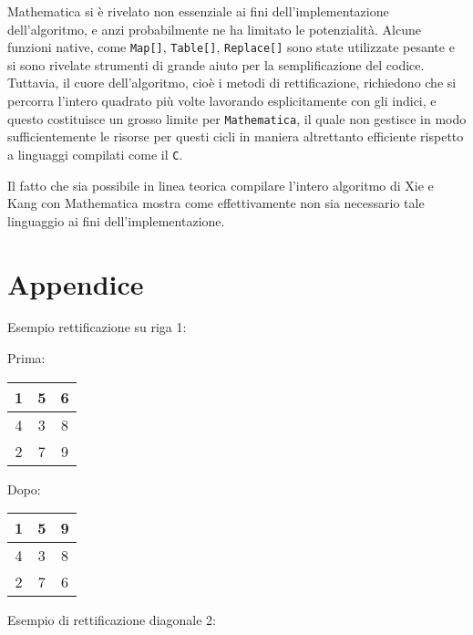 \documentclass[italian,twoside,twocolumn]{article}
\begin{document}
Mathematica si è rivelato non essenziale ai fini dell'implementazione dell'algoritmo, e anzi probabilmente ne ha limitato le potenzialità. Alcune funzioni native, come \texttt{Map[]}, \texttt{Table[]}, \texttt{Replace[]} sono state utilizzate pesante e si sono rivelate strumenti di grande aiuto per la semplificazione del codice. Tuttavia, il cuore dell'algoritmo, cioè i metodi di rettificazione, richiedono che si percorra l'intero quadrato più volte lavorando esplicitamente con gli indici, e questo costituisce un grosso limite per \texttt{Mathematica}, il quale non gestisce in modo sufficientemente le risorse per questi cicli in maniera altrettanto efficiente rispetto a linguaggi compilati come il \texttt{C}.

Il fatto che sia possibile in linea teorica compilare l'intero algoritmo di Xie e Kang con Mathematica mostra come effettivamente non sia necessario tale linguaggio ai fini dell'implementazione. 

\section{Appendice}

Esempio rettificazione su riga 1:

Prima: 

\begin{tabular}{|c|c|c|}
	\hline 
	\rule[-1ex]{0pt}{2.5ex} 1 & 5 & 6 \\ 
	\hline 
	\rule[-1ex]{0pt}{2.5ex} 4 & 3 & 8 \\ 
	\hline 
	\rule[-1ex]{0pt}{2.5ex} 2 & 7 & 9 \\ 
	\hline 
\end{tabular} 

Dopo: 

\begin{tabular}{|c|c|c|}
	\hline 
	\rule[-1ex]{0pt}{2.5ex} 1 & 5 & 9 \\ 
	\hline 
	\rule[-1ex]{0pt}{2.5ex} 4 & 3 & 8 \\ 
	\hline 
	\rule[-1ex]{0pt}{2.5ex} 2 & 7 & 6 \\ 
	\hline 
\end{tabular} 


Esempio di rettificazione diagonale 2:
\end{document}
